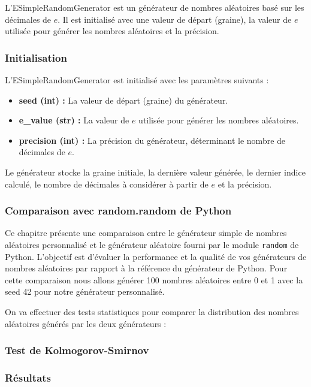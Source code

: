 \documentclass{article}
\begin{document}
L'ESimpleRandomGenerator est un générateur de nombres aléatoires basé sur les décimales de \(e\). Il est initialisé avec une valeur de départ (graine), la valeur de \(e\) utilisée pour générer les nombres aléatoires et la précision.

\subsubsection{Initialisation}

L'ESimpleRandomGenerator est initialisé avec les paramètres suivants :

\begin{itemize}
    \item \textbf{seed (int) :} La valeur de départ (graine) du générateur.
    \item \textbf{e\_value (str) :} La valeur de \(e\) utilisée pour générer les nombres aléatoires.
    \item \textbf{precision (int) :} La précision du générateur, déterminant le nombre de décimales de \(e\).
\end{itemize}

Le générateur stocke la graine initiale, la dernière valeur générée, le dernier indice calculé, le nombre de décimales à considérer à partir de \(e\) et la précision.

\subsubsection{Comparaison avec random.random de Python}

Ce chapitre présente une comparaison entre le générateur simple de nombres aléatoires personnalisé et le générateur aléatoire fourni par le module \texttt{random} de Python. L'objectif est d'évaluer la performance et la qualité de vos générateurs de nombres aléatoires par rapport à la référence du générateur de Python.
Pour cette comparaison nous allons générer 100 nombres aléatoires entre 0 et 1 avec la seed 42 pour notre générateur personnalisé.

On va effectuer des tests statistiques pour comparer la distribution des nombres aléatoires générés par les deux générateurs :
\subsubsection*{Test de Kolmogorov-Smirnov}

\subsubsection*{Résultats}
\end{document}
